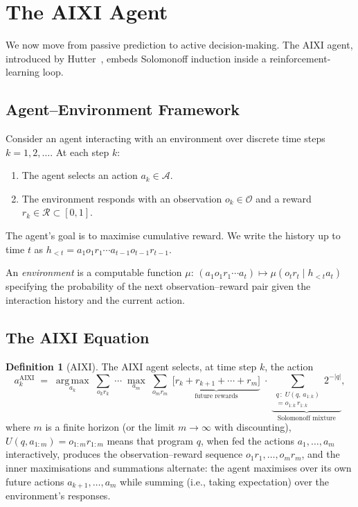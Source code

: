 \documentclass[11pt,a4paper]{article}
\theoremstyle{definition}
\newtheorem{definition}[theorem]{Definition}
\theoremstyle{remark}
\newcommand{\argmax}{\operatorname*{arg\,max}}
\begin{document}
\section{The AIXI Agent}\label{sec:aixi}

We now move from passive prediction to active decision-making.
The AIXI agent, introduced by Hutter~\cite{Hutter2000,Hutter2005}, embeds
Solomonoff induction inside a reinforcement-learning loop.

\subsection{Agent--Environment Framework}

Consider an agent interacting with an environment over discrete time steps
$k=1,2,\ldots$.  At each step $k$:
\begin{enumerate}[nosep]
\item The agent selects an action $a_k\in\mathcal{A}$.
\item The environment responds with an observation $o_k\in\mathcal{O}$ and a
      reward $r_k\in\mathcal{R}\subset[0,1]$.
\end{enumerate}
The agent's goal is to maximise cumulative reward.  We write the history up to
time $t$ as $h_{<t}=a_1 o_1 r_1\cdots a_{t-1}o_{t-1}r_{t-1}$.

An \emph{environment} is a computable function
$\mu:\,(a_1 o_1 r_1\cdots a_t)\mapsto \mu(o_t r_t\mid h_{<t}a_t)$
specifying the probability of the next observation--reward pair given the
interaction history and the current action.

\subsection{The AIXI Equation}

\begin{definition}[AIXI]\label{def:aixi}
The AIXI agent selects, at time step $k$, the action
\begin{equation}\label{eq:aixi}
  a_k^{\mathrm{AIXI}}
  \;=\;
  \argmax_{a_k}\;
  \sum_{o_k r_k}\;\cdots\;
  \max_{a_m}\;\sum_{o_m r_m}\;
  \underbrace{\bigl[r_k+r_{k+1}+\cdots+r_m\bigr]}_{\text{future rewards}}
  \;\cdot\;
  \underbrace{\sum_{\substack{q\,:\;U(q,\,a_{1:k})\\= o_{1:k}\,r_{1:k}}} 2^{-|q|}}_{\text{Solomonoff mixture}},
\end{equation}
where $m$ is a finite horizon (or the limit $m\to\infty$ with discounting),
$U(q,a_{1:m})=o_{1:m}r_{1:m}$ means that program $q$, when fed the
actions $a_1,\ldots,a_m$ interactively, produces the observation--reward
sequence $o_1 r_1,\ldots,o_m r_m$, and the inner maximisations and summations
alternate: the agent maximises over its own future actions
$a_{k+1},\ldots,a_m$ while summing (i.e., taking expectation) over the
environment's responses.
\end{definition}
\end{document}
